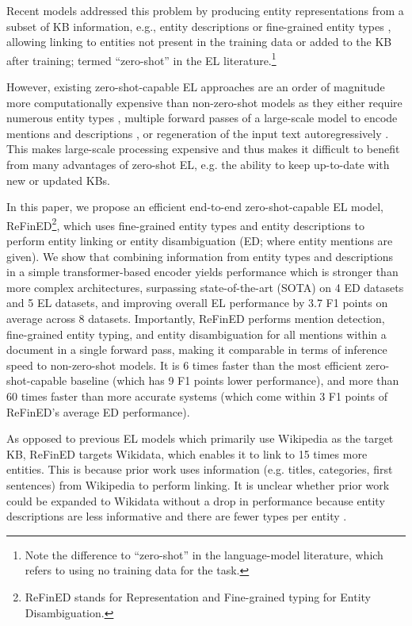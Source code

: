 \documentclass[11pt]{article}
\begin{document}
Recent models addressed this problem by producing entity representations from a subset of KB information, e.g., entity descriptions \citep{wu-etal-2020-scalable, logeswaran-etal-2019-zero} or fine-grained entity types \citep{DBLP:conf/aaai/OnoeD20, Raiman2018DeepTypeME}, allowing linking to entities not present in the training data or added to the KB after training; termed ``zero-shot'' in the EL literature.\footnote{Note the difference to ``zero-shot'' in the language-model literature, which refers to using no training data for the task.}

However, existing zero-shot-capable EL approaches are an order of magnitude more computationally expensive than non-zero-shot models \citep{rel} as they either require numerous entity types \citep{DBLP:conf/aaai/OnoeD20}, multiple forward passes of a large-scale model to encode mentions and descriptions \citep{wu-etal-2020-scalable}, or regeneration of the input text autoregressively \cite{Cao2020AutoregressiveER}. This makes large-scale processing expensive and thus makes it difficult to benefit from many advantages of zero-shot EL, e.g. the ability to keep up-to-date with new or updated KBs.




In this paper, we propose an efficient end-to-end zero-shot-capable EL model, ReFinED\footnote{ReFinED stands for Representation and Fine-grained typing for Entity Disambiguation.}, which uses fine-grained entity types and entity descriptions to perform entity linking or entity disambiguation (ED; where entity mentions are given). We show that combining information from entity types and descriptions in a simple transformer-based encoder yields performance which is stronger than more complex architectures, surpassing state-of-the-art (SOTA) on 4 ED datasets and 5 EL datasets, and improving overall EL performance by 3.7 F1 points on average across 8 datasets. Importantly, ReFinED performs mention detection, fine-grained entity typing, and entity disambiguation for all mentions within a document in a single forward pass, making it comparable in terms of inference speed to non-zero-shot models. It is 6 times faster than the most efficient zero-shot-capable baseline (which has 9 F1 points lower performance), and more than 60 times faster than more accurate systems (which come within 3 F1 points of ReFinED's average ED performance).





As opposed to previous EL models which primarily use Wikipedia as the target KB, ReFinED targets Wikidata, which enables it to link to 15 times more entities. This is because prior work uses information (e.g. titles, categories, first sentences) from Wikipedia to perform linking. It is unclear whether prior work could be expanded to Wikidata without a drop in performance because entity descriptions are less informative and there are fewer types per entity \citep{weikum2021machine}.
\end{document}
